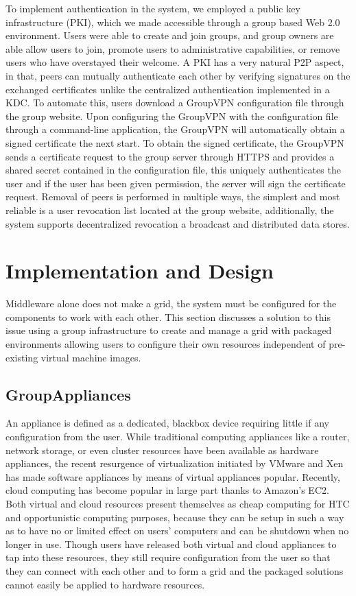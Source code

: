 \documentclass{sig-alternate}
\begin{document}
To implement authentication in the system, we employed a public key
infrastructure (PKI), which we made accessible through a group based Web 2.0
environment.  Users were able to create and join groups, and group owners are
able allow users to join, promote users to administrative capabilities, or
remove users who have overstayed their welcome.  A PKI has a very natural P2P
aspect, in that, peers can mutually authenticate each other by verifying
signatures on the exchanged certificates unlike the centralized authentication
implemented in a KDC.  To automate this, users download a GroupVPN
configuration file through the group website.  Upon configuring the GroupVPN
with the configuration file through a command-line application, the GroupVPN
will automatically obtain a signed certificate the next start.  To obtain the
signed certificate, the GroupVPN sends a certificate request to the group
server through HTTPS and provides a shared secret contained in the
configuration file, this uniquely authenticates the user and if the user has
been given permission, the server will sign the certificate request.  Removal
of peers is performed in multiple ways, the simplest and most reliable is a
user revocation list located at the group website, additionally, the system
supports decentralized revocation a broadcast and distributed data stores.

\section{Implementation and Design}
Middleware alone does not make a grid, the system must be configured for the
components to work with each other.  This section discusses a solution to this
issue using a group infrastructure to create and manage a grid with packaged
environments allowing users to configure their own resources independent of
pre-existing virtual machine images.

\subsection{GroupAppliances}
An appliance is defined as a dedicated, blackbox device requiring little if any
configuration from the user.  While traditional computing appliances like a
router, network storage, or even cluster resources have been available as
hardware appliances, the recent resurgence of virtualization initiated by
VMware and Xen has made software appliances by means of virtual appliances
popular.  Recently, cloud computing has become popular in large part thanks to
Amazon's EC2.  Both virtual and cloud resources present themselves as cheap
computing for HTC and opportunistic computing purposes, because they can be
setup in such a way as to have no or limited effect on users' computers and can
be shutdown when no longer in use.  Though users have released both virtual and
cloud appliances to tap into these resources, they still require configuration
from the user so that they can connect with each other and to form a grid and
the packaged solutions cannot easily be applied to hardware resources.
\end{document}
